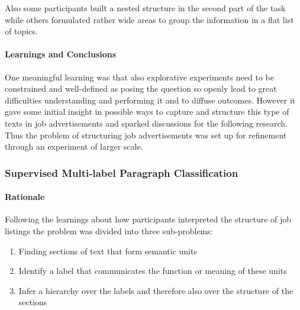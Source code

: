Also some participants built a nested structure in the second part of the task while others formulated rather wide areas to group the information in a flat list of topics.

\paragraph{Learnings and Conclusions}
\label{par:Learnings and Conclusions (Inferring Structure of Job Advertisements)}

One meaningful learning was that also explorative experiments need to be constrained and well-defined as posing the question so openly lead to great difficulties understanding and performing it and to diffuse outcomes. However it gave some initial insight in possible ways to capture and structure this type of texts in job advertisements and sparked discussions for the following research. Thus the problem of structuring job advertisements was set up for refinement through an experiment of larger scale.

\subsubsection{Supervised Multi-label Paragraph Classification}
\label{subs:Supervised Multi-label Paragraph Classification}

\paragraph{Rationale}
\label{par:Rationale (Multi-label Paragraph Classification)}

Following the learnings about how participants interpreted the structure of job listings the problem was divided into three sub-problems:

\begin{enumerate}
  \item Finding sections of text that form semantic units
  \item Identify a label that communicates the function or meaning of these units
  \item Infer a hierarchy over the labels and therefore also over the structure of the sections
\end{enumerate}

